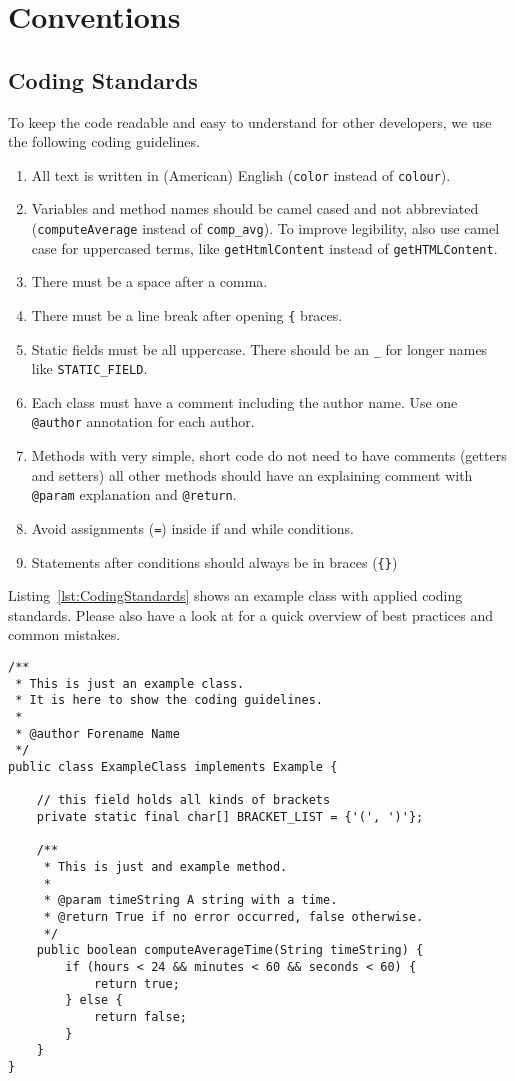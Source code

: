 \chapter{Conventions}
\section{Coding Standards}
To keep the code readable and easy to understand for other developers, we use the following coding guidelines.
\begin{enumerate}
\item All text is written in (American) English (\texttt{color} instead of \texttt{colour}).
\item Variables and method names should be camel cased and not abbreviated (\texttt{computeAverage} instead of \texttt{comp\_avg}). To improve legibility, also use camel case for uppercased terms, like \texttt{getHtmlContent} instead of \texttt{getHTMLContent}.
\item There must be a space after a comma.
\item There must be a line break after opening \texttt{\{} braces.
\item Static fields must be all uppercase. There should be an \texttt{\_} for longer names like \texttt{STATIC\_FIELD}.
\item Each class must have a comment including the author name. Use one \texttt{@author} annotation for each author.
\item Methods with very simple, short code do not need to have comments (getters and setters) all other methods should have an explaining comment with \texttt{@param} explanation and \texttt{@return}.
\item Avoid assignments (\texttt{=}) inside if and while conditions.
\item Statements after conditions should always be in braces (\texttt{\{\}})
\end{enumerate}

Listing~\ref{lst:CodingStandards} shows an example class with applied coding standards. Please also have a look at \cite{JavaCodeConventions, JavaAntiPatterns} for a quick overview of best practices and common mistakes.

\begin{codelisting}
\begin{lstlisting}[caption=Example class for coding guidelines,label=lst:CodingStandards,frame=tb]
/**
 * This is just an example class.
 * It is here to show the coding guidelines.
 * 
 * @author Forename Name
 */
public class ExampleClass implements Example {

	// this field holds all kinds of brackets
	private static final char[] BRACKET_LIST = {'(', ')'};

	/**
	 * This is just and example method.
	 * 
	 * @param timeString A string with a time.
	 * @return True if no error occurred, false otherwise.
	 */
	public boolean computeAverageTime(String timeString) {
		if (hours < 24 && minutes < 60 && seconds < 60) {
			return true;
		} else {
			return false;
		}
	}
}
\end{lstlisting}
\end{codelisting}

